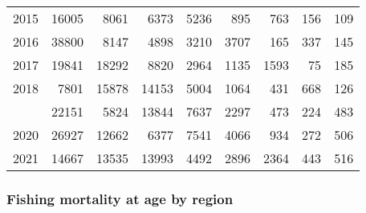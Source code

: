\documentclass[
]{article}
\begin{document}
\begin{longtable}[t]{lrrrrrrrr}
2015 & 16005 & 8061 & 6373 & 5236 & 895 & 763 & 156 & 109\\
2016 & 38800 & 8147 & 4898 & 3210 & 3707 & 165 & 337 & 145\\
2017 & 19841 & 18292 & 8820 & 2964 & 1135 & 1593 & 75 & 185\\
2018 & 7801 & 15878 & 14153 & 5004 & 1064 & 431 & 668 & 126\\
\addlinespace
2019 & 22151 & 5824 & 13844 & 7637 & 2297 & 473 & 224 & 483\\
2020 & 26927 & 12662 & 6377 & 7541 & 4066 & 934 & 272 & 506\\
2021 & 14667 & 13535 & 13993 & 4492 & 2896 & 2364 & 443 & 516\\*
\end{longtable}

\hypertarget{fishing-mortality-at-age-by-region}{%
\subsubsection{Fishing mortality at age by
region}\label{fishing-mortality-at-age-by-region}}
\end{document}
